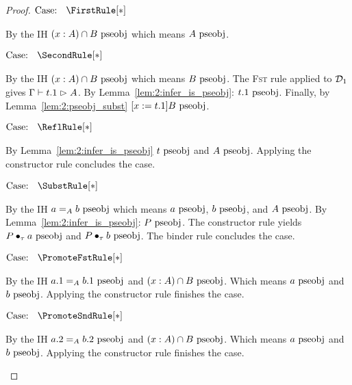 \begin{proof}
    $\text{Case: }\begin{array}{c} \FirstRule[*] \end{array}$
    \begin{proofcase}
        By the IH $(x : A) \cap B ~\mbox{\normalfont pseobj}$ which means $A~\mbox{\normalfont pseobj}$.
    \end{proofcase}

    $\text{Case: }\begin{array}{c} \SecondRule[*] \end{array}$
    \begin{proofcase}
        By the IH $(x : A) \cap B ~\mbox{\normalfont pseobj}$ which means $B~\mbox{\normalfont pseobj}$.
        The \textsc{Fst} rule applied to $\mathcal{D}_{1}$ gives $\Gamma \vdash t.1 \vartriangleright A$.
        By Lemma~\ref{lem:2:infer_is_pseobj}: $t.1~\mbox{\normalfont pseobj}$.
        Finally, by Lemma~\ref{lem:2:pseobj_subst} $[x := t.1]B~\mbox{\normalfont pseobj}$.
    \end{proofcase}

    $\text{Case: }\begin{array}{c} \ReflRule[*] \end{array}$
    \begin{proofcase}
        By Lemma~\ref{lem:2:infer_is_pseobj} $t~\mbox{\normalfont pseobj}$ and $A~\mbox{\normalfont pseobj}$.
        Applying the constructor rule concludes the case.
    \end{proofcase}

    $\text{Case: }\begin{array}{c} \SubstRule[*] \end{array}$
    \begin{proofcase}
        By the IH $a =_A b~\mbox{\normalfont pseobj}$ which means $a~\mbox{\normalfont pseobj}$, $b~\mbox{\normalfont pseobj}$, and $A~\mbox{\normalfont pseobj}$.
        By Lemma~\ref{lem:2:infer_is_pseobj}: $P~\mbox{\normalfont pseobj}$.
        The constructor rule yields $P \bullet_{\tau} a~\mbox{\normalfont pseobj}$ and $P \bullet_{\tau} b~\mbox{\normalfont pseobj}$.
        The binder rule concludes the case.
    \end{proofcase}

    $\text{Case: }\begin{array}{c} \PromoteFstRule[*] \end{array}$
    \begin{proofcase}
        By the IH $a.1 =_A b.1~\mbox{\normalfont pseobj}$ and $(x : A) \cap B~\mbox{\normalfont pseobj}$. Which means $a~\mbox{\normalfont pseobj}$ and $b~\mbox{\normalfont pseobj}$.
        Applying the constructor rule finishes the case.
    \end{proofcase}

    $\text{Case: }\begin{array}{c} \PromoteSndRule[*] \end{array}$
    \begin{proofcase}
        By the IH $a.2 =_A b.2~\mbox{\normalfont pseobj}$ and $(x : A) \cap B~\mbox{\normalfont pseobj}$. Which means $a~\mbox{\normalfont pseobj}$ and $b~\mbox{\normalfont pseobj}$.
        Applying the constructor rule finishes the case.
    \end{proofcase}


\end{proof}
